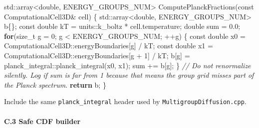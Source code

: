 \documentclass[
]{article}
\newenvironment{Shaded}{}{}
\newcommand{\AttributeTok}[1]{\textcolor[rgb]{0.49,0.56,0.16}{#1}}
\newcommand{\BuiltInTok}[1]{\textcolor[rgb]{0.00,0.50,0.00}{#1}}
\newcommand{\CommentTok}[1]{\textcolor[rgb]{0.38,0.63,0.69}{\textit{#1}}}
\newcommand{\ControlFlowTok}[1]{\textcolor[rgb]{0.00,0.44,0.13}{\textbf{#1}}}
\newcommand{\DataTypeTok}[1]{\textcolor[rgb]{0.56,0.13,0.00}{#1}}
\newcommand{\DecValTok}[1]{\textcolor[rgb]{0.25,0.63,0.44}{#1}}
\newcommand{\FloatTok}[1]{\textcolor[rgb]{0.25,0.63,0.44}{#1}}
\newcommand{\NormalTok}[1]{#1}
\newcommand{\OperatorTok}[1]{\textcolor[rgb]{0.40,0.40,0.40}{#1}}
\begin{document}
\begin{Shaded}
\begin{Highlighting}[]
\BuiltInTok{std::}\NormalTok{array}\OperatorTok{\textless{}}\DataTypeTok{double}\OperatorTok{,}\NormalTok{ ENERGY\_GROUPS\_NUM}\OperatorTok{\textgreater{}}\NormalTok{ ComputePlanckFractions}\OperatorTok{(}\AttributeTok{const}\NormalTok{ ComputationalCell3D}\OperatorTok{\&}\NormalTok{ cell}\OperatorTok{)}
\OperatorTok{\{}
    \BuiltInTok{std::}\NormalTok{array}\OperatorTok{\textless{}}\DataTypeTok{double}\OperatorTok{,}\NormalTok{ ENERGY\_GROUPS\_NUM}\OperatorTok{\textgreater{}}\NormalTok{ b}\OperatorTok{\{\};}
    \AttributeTok{const} \DataTypeTok{double}\NormalTok{ kT }\OperatorTok{=}\NormalTok{ units}\OperatorTok{::}\NormalTok{k\_boltz }\OperatorTok{*}\NormalTok{ cell}\OperatorTok{.}\NormalTok{temperature}\OperatorTok{;}
    \DataTypeTok{double}\NormalTok{ sum }\OperatorTok{=} \FloatTok{0.0}\OperatorTok{;}
    \ControlFlowTok{for}\OperatorTok{(}\DataTypeTok{size\_t}\NormalTok{ g }\OperatorTok{=} \DecValTok{0}\OperatorTok{;}\NormalTok{ g }\OperatorTok{\textless{}}\NormalTok{ ENERGY\_GROUPS\_NUM}\OperatorTok{;} \OperatorTok{++}\NormalTok{g}\OperatorTok{)}
    \OperatorTok{\{}
        \AttributeTok{const} \DataTypeTok{double}\NormalTok{ x0 }\OperatorTok{=}\NormalTok{ ComputationalCell3D}\OperatorTok{::}\NormalTok{energyBoundaries}\OperatorTok{[}\NormalTok{g}\OperatorTok{]} \OperatorTok{/}\NormalTok{ kT}\OperatorTok{;}
        \AttributeTok{const} \DataTypeTok{double}\NormalTok{ x1 }\OperatorTok{=}\NormalTok{ ComputationalCell3D}\OperatorTok{::}\NormalTok{energyBoundaries}\OperatorTok{[}\NormalTok{g }\OperatorTok{+} \DecValTok{1}\OperatorTok{]} \OperatorTok{/}\NormalTok{ kT}\OperatorTok{;}
\NormalTok{        b}\OperatorTok{[}\NormalTok{g}\OperatorTok{]} \OperatorTok{=}\NormalTok{ planck\_integral}\OperatorTok{::}\NormalTok{planck\_integral}\OperatorTok{(}\NormalTok{x0}\OperatorTok{,}\NormalTok{ x1}\OperatorTok{);}
\NormalTok{        sum }\OperatorTok{+=}\NormalTok{ b}\OperatorTok{[}\NormalTok{g}\OperatorTok{];}
    \OperatorTok{\}}
    \CommentTok{// Do not renormalize silently. Log if sum is far from 1 because that means the group grid misses part of the Planck spectrum.}
    \ControlFlowTok{return}\NormalTok{ b}\OperatorTok{;}
\OperatorTok{\}}
\end{Highlighting}
\end{Shaded}

Include the same \texttt{planck\_integral} header used by
\texttt{MultigroupDiffusion.cpp}.

\paragraph{C.3 Safe CDF builder}\label{c.3-safe-cdf-builder}
\end{document}

